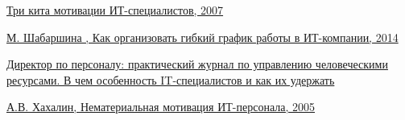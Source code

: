 \documentclass{../industrial-development}
\begin{document}
\begin{thebibliography}{99}
	 \href{https://www.osp.ru/cio/2007/08/4326047/}{Три кита мотивации ИТ-специалистов, 2007}
	
	 \href{http://saas.ru/cases/~kak-orghanizovat-ghibkii-ghrafik-raboty-v-it-kompanii}{М. Шабаршина , Как организовать гибкий график работы в ИТ-компании, 2014}
	
	 \href{https://www.hr-director.ru/article/63599-qqe-15-m4-v-kompanii-ploho-prijivayutsya-it-spetsialisty}{Директор по персоналу: практический журнал по управлению человеческими ресурсами. В чем особенность IT-специалистов и как их удержать}
	
	 \href{https://www.ippnou.ru/print/001184/}{А.В. Хахалин, Нематериальная мотивация ИТ-персонала, 2005}
	
\end{thebibliography}
\end{document}
